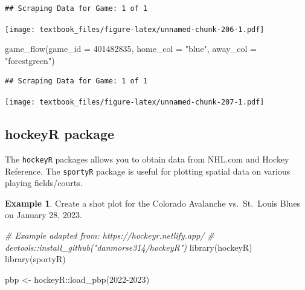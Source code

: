 \documentclass[
  11pt,
]{book}
\newenvironment{Shaded}{\begin{snugshade}}{\end{snugshade}}
\newcommand{\AttributeTok}[1]{\textcolor[rgb]{0.77,0.63,0.00}{#1}}
\newcommand{\CommentTok}[1]{\textcolor[rgb]{0.56,0.35,0.01}{\textit{#1}}}
\newcommand{\DecValTok}[1]{\textcolor[rgb]{0.00,0.00,0.81}{#1}}
\newcommand{\FunctionTok}[1]{\textcolor[rgb]{0.00,0.00,0.00}{#1}}
\newcommand{\NormalTok}[1]{#1}
\newcommand{\OtherTok}[1]{\textcolor[rgb]{0.56,0.35,0.01}{#1}}
\newcommand{\SpecialCharTok}[1]{\textcolor[rgb]{0.00,0.00,0.00}{#1}}
\newcommand{\StringTok}[1]{\textcolor[rgb]{0.31,0.60,0.02}{#1}}
\theoremstyle{definition}
\theoremstyle{definition}
\newtheorem{example}{Example}[chapter]
\theoremstyle{definition}
\theoremstyle{definition}
\theoremstyle{remark}
\begin{document}
\begin{verbatim}
## Scraping Data for Game: 1 of 1
\end{verbatim}

\texttt{[image: textbook\_files/figure-latex/unnamed-chunk-206-1.pdf]}
\newpage

\begin{Shaded}
\begin{Highlighting}[]
\FunctionTok{game\_flow}\NormalTok{(}\AttributeTok{game\_id =} \DecValTok{401482835}\NormalTok{, }\AttributeTok{home\_col =} \StringTok{"blue"}\NormalTok{, }\AttributeTok{away\_col =} \StringTok{"forestgreen"}\NormalTok{)}
\end{Highlighting}
\end{Shaded}

\begin{verbatim}
## Scraping Data for Game: 1 of 1
\end{verbatim}

\texttt{[image: textbook\_files/figure-latex/unnamed-chunk-207-1.pdf]}

\newpage

\hypertarget{hockeyr-package}{%
\subsection{hockeyR package}\label{hockeyr-package}}

The \texttt{hockeyR} packages allows you to obtain data from NHL.com and Hockey Reference. The \texttt{sportyR} package is useful for plotting spatial data on various playing fields/courts.

\begin{example}
Create a shot plot for the Colorado Avalanche vs.~St.~Louis Blues on January 28, 2023.
\end{example}

\begin{Shaded}
\begin{Highlighting}[]
\CommentTok{\# Example adapted from: https://hockeyr.netlify.app/}
\CommentTok{\# devtools::install\_github("danmorse314/hockeyR")}
\FunctionTok{library}\NormalTok{(hockeyR)}
\FunctionTok{library}\NormalTok{(sportyR)}

\NormalTok{pbp }\OtherTok{\textless{}{-}}\NormalTok{ hockeyR}\SpecialCharTok{::}\FunctionTok{load\_pbp}\NormalTok{(}\StringTok{\textquotesingle{}2022{-}2023\textquotesingle{}}\NormalTok{)}
\end{Highlighting}
\end{Shaded}
\end{document}

